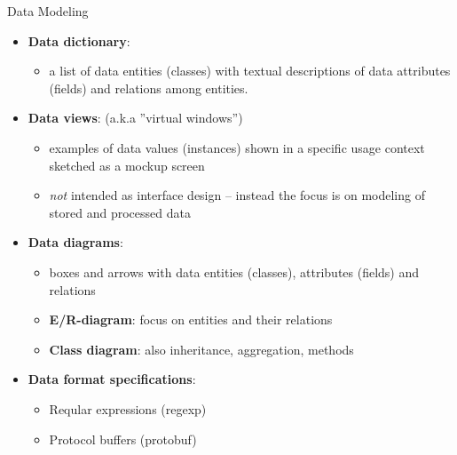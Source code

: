 \begin{Slide}{Data Modeling }
\begin{itemize}
\item \textbf{Data dictionary}:  
\begin{itemize}
\item a list of data entities (classes) with textual descriptions of data attributes (fields) and relations among entities.
\end{itemize}
\item \textbf{Data views}: (a.k.a ''virtual windows'')
\begin{itemize}
\item examples of data values (instances) shown in a specific usage context sketched as a mockup screen
\item \textit{not} intended as interface design -- instead the focus is on modeling of stored and processed data 
\end{itemize}
\item \textbf{Data diagrams}: 
\begin{itemize}
\item boxes and arrows with data entities (classes), attributes (fields) and relations
\item \textbf{E/R-diagram}: focus on entities and their relations 
\item \textbf{Class diagram}: also inheritance, aggregation, methods
\end{itemize}
\item \textbf{Data format specifications}:
\begin{itemize}
\item Reqular expressions (regexp)
\item Protocol buffers (protobuf)

\end{itemize}
\end{itemize}
\end{Slide}